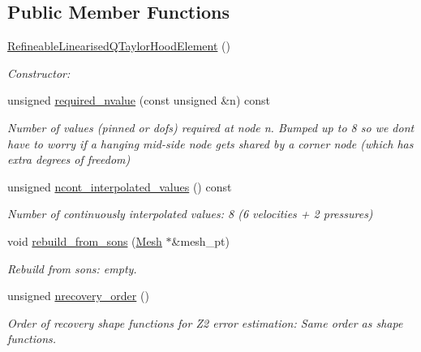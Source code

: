 \subsection*{Public Member Functions}
\begin{DoxyCompactItemize}
\item 
\hyperlink{classoomph_1_1RefineableLinearisedQTaylorHoodElement_a342e82b1d86ddbddd7b9fc491ca1ccb6}{Refineable\+Linearised\+Q\+Taylor\+Hood\+Element} ()
\begin{DoxyCompactList}\small\item\em Constructor\+: \end{DoxyCompactList}\item 
unsigned \hyperlink{classoomph_1_1RefineableLinearisedQTaylorHoodElement_a16716cc6af73490d9e2577dd090ac587}{required\+\_\+nvalue} (const unsigned \&n) const
\begin{DoxyCompactList}\small\item\em Number of values (pinned or dofs) required at node n. Bumped up to 8 so we don\textquotesingle{}t have to worry if a hanging mid-\/side node gets shared by a corner node (which has extra degrees of freedom) \end{DoxyCompactList}\item 
unsigned \hyperlink{classoomph_1_1RefineableLinearisedQTaylorHoodElement_a16a99dc576178ec2c1b9f93df45d326a}{ncont\+\_\+interpolated\+\_\+values} () const
\begin{DoxyCompactList}\small\item\em Number of continuously interpolated values\+: 8 (6 velocities + 2 pressures) \end{DoxyCompactList}\item 
void \hyperlink{classoomph_1_1RefineableLinearisedQTaylorHoodElement_a8a66062e7746027d25599a050b8ee85b}{rebuild\+\_\+from\+\_\+sons} (\hyperlink{classoomph_1_1Mesh}{Mesh} $\ast$\&mesh\+\_\+pt)
\begin{DoxyCompactList}\small\item\em Rebuild from sons\+: empty. \end{DoxyCompactList}\item 
unsigned \hyperlink{classoomph_1_1RefineableLinearisedQTaylorHoodElement_a086b235ae15bc49e1043ae6f09217ae9}{nrecovery\+\_\+order} ()
\begin{DoxyCompactList}\small\item\em Order of recovery shape functions for Z2 error estimation\+: Same order as shape functions. \end{DoxyCompactList}\item 

\end{DoxyCompactItemize}

